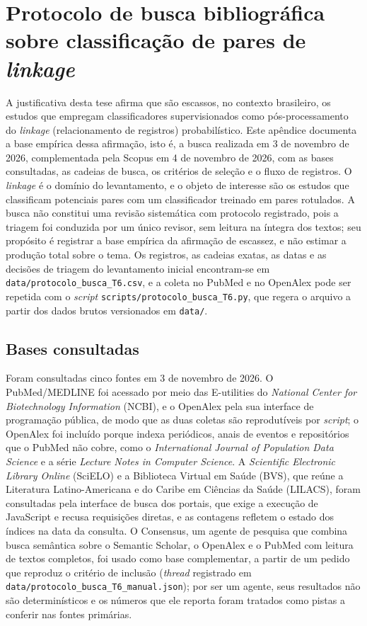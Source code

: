\chapter{Protocolo de busca bibliográfica sobre classificação de pares de \textit{linkage}}
\label{ap:protocolo-busca}

A justificativa desta tese afirma que são escassos, no contexto brasileiro, os estudos que empregam classificadores supervisionados como pós-processamento do \textit{linkage} (relacionamento de registros) probabilístico. Este apêndice documenta a base empírica dessa afirmação, isto é, a busca realizada em 3 de novembro de 2026, complementada pela Scopus em 4 de novembro de 2026, com as bases consultadas, as cadeias de busca, os critérios de seleção e o fluxo de registros. O \textit{linkage} é o domínio do levantamento, e o objeto de interesse são os estudos que classificam potenciais pares com um classificador treinado em pares rotulados. A busca não constitui uma revisão sistemática com protocolo registrado, pois a triagem foi conduzida por um único revisor, sem leitura na íntegra dos textos; seu propósito é registrar a base empírica da afirmação de escassez, e não estimar a produção total sobre o tema. Os registros, as cadeias exatas, as datas e as decisões de triagem do levantamento inicial encontram-se em \texttt{data/protocolo\_busca\_T6.csv}, e a coleta no PubMed e no OpenAlex pode ser repetida com o \textit{script} \texttt{scripts/protocolo\_busca\_T6.py}, que regera o arquivo a partir dos dados brutos versionados em \texttt{data/}.

\section{Bases consultadas}

Foram consultadas cinco fontes em 3 de novembro de 2026. O PubMed/MEDLINE foi acessado por meio das E-utilities do \textit{National Center for Biotechnology Information} (NCBI), e o OpenAlex pela sua interface de programação pública, de modo que as duas coletas são reprodutíveis por \textit{script}; o OpenAlex foi incluído porque indexa periódicos, anais de eventos e repositórios que o PubMed não cobre, como o \textit{International Journal of Population Data Science} e a série \textit{Lecture Notes in Computer Science}. A \textit{Scientific Electronic Library Online} (SciELO) e a Biblioteca Virtual em Saúde (BVS), que reúne a Literatura Latino-Americana e do Caribe em Ciências da Saúde (LILACS), foram consultadas pela interface de busca dos portais, que exige a execução de JavaScript e recusa requisições diretas, e as contagens refletem o estado dos índices na data da consulta. O Consensus, um agente de pesquisa que combina busca semântica sobre o Semantic Scholar, o OpenAlex e o PubMed com leitura de textos completos, foi usado como base complementar, a partir de um pedido que reproduz o critério de inclusão (\textit{thread} registrado em \texttt{data/protocolo\_busca\_T6\_manual.json}); por ser um agente, seus resultados não são determinísticos e os números que ele reporta foram tratados como pistas a conferir nas fontes primárias.

